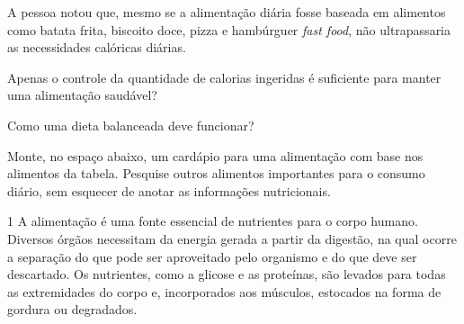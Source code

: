 
A pessoa notou que, mesmo se a alimentação diária fosse baseada em
alimentos como batata frita, biscoito doce, pizza e hambúrguer \textit{fast
food}, não ultrapassaria as necessidades calóricas diárias.

\begin{escolha}
\item Apenas o controle da quantidade de calorias ingeridas é
suficiente para manter uma alimentação saudável?


\item Como uma dieta balanceada deve funcionar?


\item Monte, no espaço abaixo, um cardápio para uma alimentação
com base nos alimentos da tabela. Pesquise outros alimentos importantes
para o consumo diário, sem esquecer de anotar as informações
nutricionais.


\end{escolha}


\num{1} A alimentação é uma fonte essencial de nutrientes para o
corpo humano. Diversos órgãos necessitam da energia gerada a partir da
digestão, na qual ocorre a separação do que pode ser aproveitado pelo organismo
e do que deve ser descartado. Os nutrientes, como a glicose e as
proteínas, são levados para todas as extremidades do corpo e,
incorporados aos músculos, estocados na forma de gordura ou degradados.

